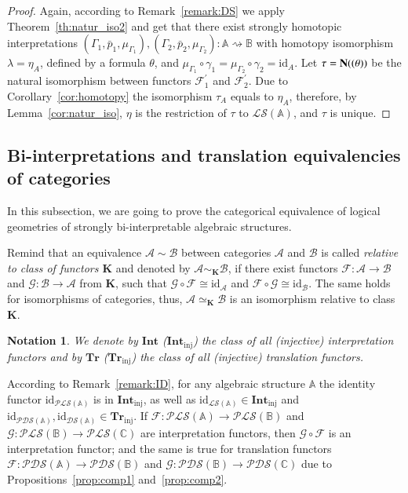 \documentclass[12pt]{article}
\newtheorem{notation}{Notation}
\theoremstyle{definition}
\def\MA{{\mathbb{A}}}
\def\MB{{\mathbb{B}}}
\def\MC{{\mathbb{C}}}
\def\F{{\mathcal{F}}}
\def\G{{\mathcal{G}}}
\def\Int{{\mathbf{Int}}}
\def\Tr{{\mathbf{Tr}}}
\newcommand{\Inj}{\mathrm{inj}}
\def\PLS{{\mathcal{PLS}}}
\def\PDS{{\mathcal{PDS}}}
\def\DS{{\mathcal{DS}}}
\def\LS{{\mathcal{LS}}}
\def\id{{\mathrm{id}}}
\begin{document}
\begin{proof}
Again, according to Remark~\ref{remark:DS} we apply Theorem~\ref{th:natur_iso2} and get that there exist strongly homotopic interpretations $(\Gamma_1,\bar p_1,\mu_{\Gamma_1}),(\Gamma_2,\bar p_2,\mu_{\Gamma_2})\colon \MA \rightsquigarrow \MB$ with homotopy isomorphism $\lambda=\eta_A$, defined by a formula $\theta$, and $\mu_{\Gamma_1} \circ\gamma_1=\mu_{\Gamma_2} \circ\gamma_2=\id_A$. Let $\tau={\bf N}((\theta))$ be the natural isomorphism between functors $\F_1^\prime$ and $\F_2^\prime$. Due to Corollary~\ref{cor:homotopy} the isomorphism $\tau_A$ equals to $\eta_A$, therefore, by Lemma~\ref{cor:natur_iso}, $\eta$ is the restriction of $\tau$ to $\LS(\MA)$, and $\tau$ is unique.
\end{proof}

\subsection{Bi-interpretations and translation equivalencies of categories}\label{subsec:bi}

In this subsection, we are going to prove the categorical equivalence of logical geometries of strongly bi-interpretable algebraic structures. 

Remind that an equivalence $\mathcal{A}\sim \mathcal{B}$ between categories $\mathcal{A}$ and $\mathcal{B}$ is called {\em relative to class of functors $\mathbf{K}$} and denoted by $\mathcal{A}\sim_\mathbf{K} \mathcal{B}$, if there exist functors $\F\colon\mathcal{A}\to\mathcal{B}$ and $\G\colon\mathcal{B}\to\mathcal{A}$ from $\mathbf{K}$, such that $\G\circ\F\cong\id_\mathcal{A}$ and $\F\circ\G\cong\id_{\mathcal{B}}$. The same holds for isomorphisms of categories, thus, $\mathcal{A}\simeq_\mathbf{K}\mathcal{B}$ is an isomorphism relative to class $\mathbf{K}$.

\begin{notation}
We denote by $\Int$ ($\Int_\Inj$) the class of all (injective) interpretation functors and by $\Tr$ ($\Tr_\Inj$) the class of all (injective) translation functors.
\end{notation}

According to Remark~\ref{remark:ID}, for any algebraic structure $\MA$ the identity functor $\id_{\PLS(\MA)}$ is in $\Int_\Inj$, as well as $\id_{\LS(\MA)}\in\Int_\Inj$ and $\id_{\PDS(\MA)},\id_{\DS(\MA)}\in\Tr_\Inj$. If $\F\colon \PLS(\MA)\to \PLS(\MB)$ and $\G\colon\PLS(\MB)\to \PLS(\MC)$ are interpretation functors, then $\G\circ\F$ is an interpretation functor; and the same is true for translation functors $\F\colon \PDS(\MA)\to \PDS(\MB)$ and $\G\colon\PDS(\MB)\to \PDS(\MC)$ due to Propositions~\ref{prop:comp1} and~\ref{prop:comp2}.
\end{document}
